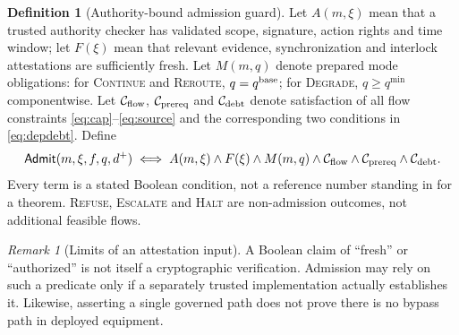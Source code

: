 \documentclass[11pt,letterpaper]{article}
\theoremstyle{definition}\newtheorem{definition}[theorem]{Definition}\newtheorem{example}[theorem]{Example}
\theoremstyle{remark}\newtheorem{remark}[theorem]{Remark}
\begin{document}
\begin{definition}[Authority-bound admission guard]\label{def:guard}
Let $A(m,\xi)$ mean that a trusted authority checker has validated scope, signature, action rights and time window; let $F(\xi)$ mean that relevant evidence, synchronization and interlock attestations are sufficiently fresh. Let $M(m,q)$ denote prepared mode obligations: for \textsc{Continue} and \textsc{Reroute}, $q=q^{\rm base}$; for \textsc{Degrade}, $q\ge q^{\min}$ componentwise. Let $\mathcal C_{\rm flow}$, $\mathcal C_{\rm prereq}$ and $\mathcal C_{\rm debt}$ denote satisfaction of all flow constraints \eqref{eq:cap}--\eqref{eq:source} and the corresponding two conditions in \eqref{eq:depdebt}. Define
\begin{equation}\label{eq:guard}
\mathsf{Admit}(m,\xi,f,q,d^+)\iff
A(m,\xi)\wedge F(\xi)\wedge M(m,q)\wedge \mathcal C_{\rm flow}\wedge \mathcal C_{\rm prereq}\wedge \mathcal C_{\rm debt}.
\end{equation}
Every term is a stated Boolean condition, not a reference number standing in for a theorem. \textsc{Refuse}, \textsc{Escalate} and \textsc{Halt} are non-admission outcomes, not additional feasible flows.
\end{definition}
\begin{remark}[Limits of an attestation input]
A Boolean claim of ``fresh'' or ``authorized'' is not itself a cryptographic verification. Admission may rely on such a predicate only if a separately trusted implementation actually establishes it. Likewise, asserting a single governed path does not prove there is no bypass path in deployed equipment.
\end{remark}
\end{document}
